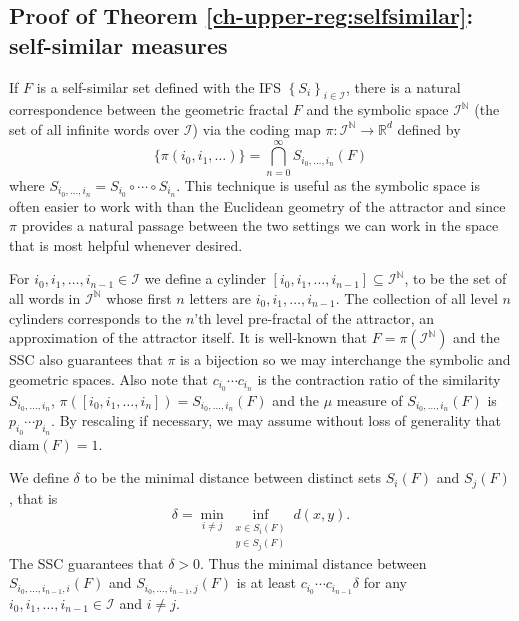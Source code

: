 \subsection{Proof of Theorem \ref{ch-upper-reg:selfsimilar}: self-similar measures} \label{ch-upper-reg:self-similar}


If $F$ is a self-similar set defined with the IFS $\left\{S_i \right\}_{i\in \mathcal{I}}$, there is a natural correspondence between the geometric fractal $F$ and the symbolic space $\mathcal{I}^{\mathbb{N}}$ (the set of all infinite words over $\mathcal{I}$) via the coding map $\pi \colon \mathcal{I}^{\mathbb{N}} \rightarrow \mathbb{R}^d$ defined by 
\[
\{\pi(i_0,i_1,\ldots) \} =  \bigcap_{n=0}^\infty S_{i_0,\ldots, i_n}(F)
\]
where $S_{i_0,\ldots, i_n} = S_{i_0} \circ \cdots \circ S_{ i_n}$. This technique is useful as the symbolic space is often easier to work with than the Euclidean geometry of the attractor and since $\pi$ provides a natural passage between the two settings we can work in the space that is most helpful whenever desired. 

For $ i_0,i_1,\ldots, i_{n-1} \in \mathcal{I}$ we define a cylinder $[i_0,i_1,\ldots, i_{n-1}] \subseteq \mathcal{I}^\mathbb{N}$, to be the set of all words in $\mathcal{I}^{\mathbb{N}}$ whose first $n$ letters are $i_0,i_1,\ldots, i_{n-1}$. The collection of all level $n$ cylinders corresponds to the  $n$'th level  pre-fractal of the attractor, an approximation of the attractor itself.  It is well-known that $F= \pi(\mathcal{I}^\mathbb{N})$ and the SSC also guarantees that $\pi$ is a bijection so we may interchange the symbolic and geometric spaces.  Also note that  $c_{i_0}\cdots c_{i_{n}}$ is the contraction ratio of the similarity $S_{i_0,\ldots, i_n} $,  $\pi([i_0,i_1,\ldots, i_{n}] ) = S_{i_0,\ldots, i_n} (F)$ and the $\mu$ measure of $S_{i_0,\ldots, i_n} (F)$  is $p_{i_0}\cdots p_{i_{n}}$.  By rescaling if necessary, we may assume without loss of generality that diam$(F)=1$. 


We define $\delta$ to be the minimal distance between distinct  sets $S_i(F)$ and $S_j(F)$, that is 
\[
\delta= \min_{i\neq j} \inf_{\substack{x \in S_i(F) \\ y \in S_j(F)}} d(x,y).
\]
The SSC guarantees that $\delta > 0$. Thus the minimal distance between $S_{i_0,\ldots,i_{n-1},i}(F)$ and $S_{i_0,\ldots,i_{n-1},j}(F)$ is at least $c_{i_0}\cdots c_{i_{n-1}} \delta$ for any   $ i_0,i_1,\ldots, i_{n-1} \in \mathcal{I}$ and $i\neq j$.


